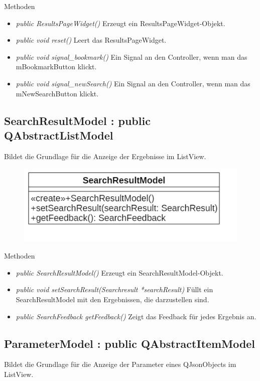 Methoden
\begin{itemize}
	\item\textit{public ResultsPageWidget()}
	Erzeugt ein ResultsPageWidget-Objekt.
	\item\textit{public void reset()}
	Leert das ResultsPageWidget.
	\item\textit{public void signal\_bookmark()}
	Ein Signal an den Controller, wenn man das mBookmarkButton klickt.
	\item\textit{public void signal\_newSearch()}
	Ein Signal an den Controller, wenn man das mNewSearchButton klickt.
\end{itemize}

\subsection*{SearchResultModel : public QAbstractListModel}
Bildet die Grundlage für die Anzeige der Ergebnisse im ListView.

\begin{figure}[H]
	\centering
	\includegraphics[scale=0.5]{img/Klassendiagramm/Klassen/View/SearchResultModel}
	\label{fig:searchResultModel}
\end{figure}

Methoden
\begin{itemize}
	\item\textit{public SearchResultModel()}
	Erzeugt ein SearchResultModel-Objekt.
	\item\textit{public void setSearchResult(Searchresult *searchResult)}
	Füllt ein SearchResultModel mit den Ergebnissen, die darzustellen sind.
	\item\textit{public SearchFeedback getFeedback()}
	Zeigt das Feedback für jedes Ergebnis an.
\end{itemize}

\subsection*{ParameterModel : public QAbstractItemModel}
Bildet die Grundlage für die Anzeige der Parameter eines QJsonObjects im ListView.

